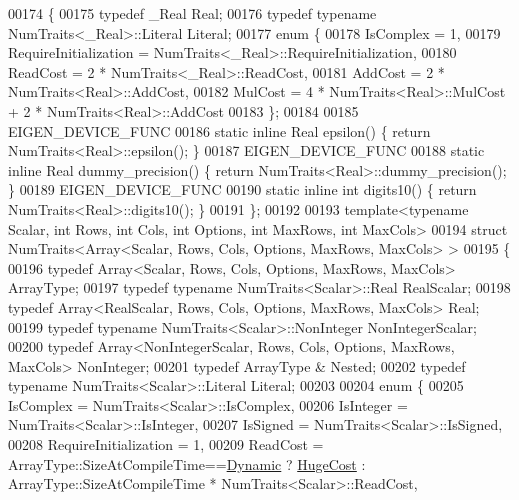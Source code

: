 \begin{DoxyCode}
00174 \{
00175   \textcolor{keyword}{typedef} \_Real Real;
00176   \textcolor{keyword}{typedef} \textcolor{keyword}{typename} NumTraits<\_Real>::Literal Literal;
00177   \textcolor{keyword}{enum} \{
00178     IsComplex = 1,
00179     RequireInitialization = NumTraits<\_Real>::RequireInitialization,
00180     ReadCost = 2 * NumTraits<\_Real>::ReadCost,
00181     AddCost = 2 * NumTraits<Real>::AddCost,
00182     MulCost = 4 * NumTraits<Real>::MulCost + 2 * NumTraits<Real>::AddCost
00183   \};
00184 
00185   EIGEN\_DEVICE\_FUNC
00186   \textcolor{keyword}{static} \textcolor{keyword}{inline} Real epsilon() \{ \textcolor{keywordflow}{return} NumTraits<Real>::epsilon(); \}
00187   EIGEN\_DEVICE\_FUNC
00188   \textcolor{keyword}{static} \textcolor{keyword}{inline} Real dummy\_precision() \{ \textcolor{keywordflow}{return} NumTraits<Real>::dummy\_precision(); \}
00189   EIGEN\_DEVICE\_FUNC
00190   \textcolor{keyword}{static} \textcolor{keyword}{inline} \textcolor{keywordtype}{int} digits10() \{ \textcolor{keywordflow}{return} NumTraits<Real>::digits10(); \}
00191 \};
00192 
00193 \textcolor{keyword}{template}<\textcolor{keyword}{typename} Scalar, \textcolor{keywordtype}{int} Rows, \textcolor{keywordtype}{int} Cols, \textcolor{keywordtype}{int} Options, \textcolor{keywordtype}{int} MaxRows, \textcolor{keywordtype}{int} MaxCols>
00194 \textcolor{keyword}{struct }NumTraits<Array<Scalar, Rows, Cols, Options, MaxRows, MaxCols> >
00195 \{
00196   \textcolor{keyword}{typedef} Array<Scalar, Rows, Cols, Options, MaxRows, MaxCols> ArrayType;
00197   \textcolor{keyword}{typedef} \textcolor{keyword}{typename} NumTraits<Scalar>::Real RealScalar;
00198   \textcolor{keyword}{typedef} Array<RealScalar, Rows, Cols, Options, MaxRows, MaxCols> Real;
00199   \textcolor{keyword}{typedef} \textcolor{keyword}{typename} NumTraits<Scalar>::NonInteger NonIntegerScalar;
00200   \textcolor{keyword}{typedef} Array<NonIntegerScalar, Rows, Cols, Options, MaxRows, MaxCols> NonInteger;
00201   \textcolor{keyword}{typedef} ArrayType & Nested;
00202   \textcolor{keyword}{typedef} \textcolor{keyword}{typename} NumTraits<Scalar>::Literal Literal;
00203 
00204   \textcolor{keyword}{enum} \{
00205     IsComplex = NumTraits<Scalar>::IsComplex,
00206     IsInteger = NumTraits<Scalar>::IsInteger,
00207     IsSigned  = NumTraits<Scalar>::IsSigned,
00208     RequireInitialization = 1,
00209     ReadCost = ArrayType::SizeAtCompileTime==\hyperlink{namespace_eigen_ad81fa7195215a0ce30017dfac309f0b2}{Dynamic} ? \hyperlink{namespace_eigen_a3163430a1c13173faffde69016b48aaf}{HugeCost} : 
      ArrayType::SizeAtCompileTime * NumTraits<Scalar>::ReadCost,

\end{DoxyCode}
